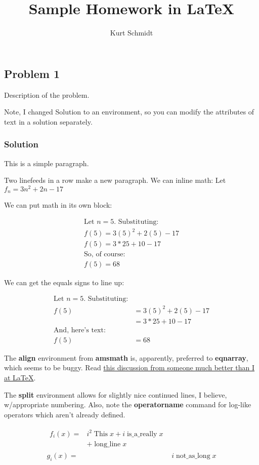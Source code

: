 \documentclass[10pt,letterpaper,oneside]{article}
\title{Sample Homework in \LaTeX}
\author{Kurt Schmidt}
\newcommand{\Problem}[1]{\subsection*{Problem #1}}
\newenvironment{Solution}
{
	\color{blue!80!black}
	\subsubsection*{Solution}
}
{}
\begin{document}
\maketitle

\Problem{1}

	Description of the problem.

	Note, I changed Solution to an environment, so you can modify the attributes of text in a solution separately.

	\begin{Solution}
		This is a simple paragraph.

		Two linefeeds in a row make a new paragraph.  We can inline math:  Let
		$f_n = 3n^2 + 2n - 17$

		We can put math in its own block:

		\begin{align*}
			\text{Let $n = 5$.  Substituting:} \\
			f(5) = 3(5)^2 + 2(5) - 17 \\
			f(5) = 3*25 + 10 - 17 \\
			\text{So, of course:} \\
			f(5) = 68 
		\end{align*}

		We can get the equals signs to line up:

		\begin{align*}
			\text{Let $n = 5$.  Substituting:} \\
			f(5) & = 3(5)^2 + 2(5) - 17 \\
					& = 3*25 + 10 - 17 \\
			\text{And, here's text:} \\
			f(5) & = 68 
		\end{align*}

		The \textbf{align} environment from \textbf{amsmath} is, apparently, preferred to \textbf{eqnarray}, which
		seems to be buggy.  Read \href{http://www.tug.org/pracjourn/2006-4/madsen/madsen.pdf}{this discussion from someone
		much better than I at \LaTeX}.

		The \textbf{split} environment allows for slightly nice continued lines, I believe, w/appropriate numbering.  Also,
		note the \textbf{operatorname} command for log-like operators which aren't already defined.

		\begin{align}
			\begin{split}
			f_i(x) = & i^2 \operatorname{This} x + i \operatorname{is\_a\_really} x \\
							& + \operatorname{long\_line} x 
			\end{split} \\
			g_i(x) = & i \operatorname{not\_as\_long} x
		\end{align}

	\end{Solution}
\end{document}
